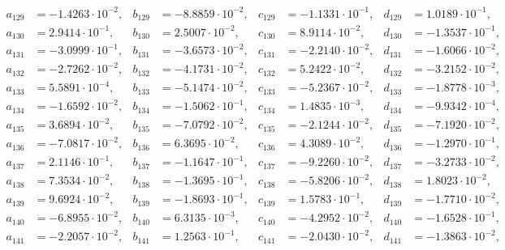 \begin{align*}
  a_{ 129 } &= -1.4263 \cdot 10^{ -2 }, & b_{ 129 } &= -8.8859 \cdot 10^{ -2 }, & c_{ 129 } &= -1.1331 \cdot 10^{ -1 }, & d_{ 129 } &= 1.0189 \cdot 10^{ -1 }, \\ 
  a_{ 130 } &= 2.9414 \cdot 10^{ -1 }, & b_{ 130 } &= 2.5007 \cdot 10^{ -2 }, & c_{ 130 } &= 8.9114 \cdot 10^{ -2 }, & d_{ 130 } &= -1.3537 \cdot 10^{ -1 }, \\ 
  a_{ 131 } &= -3.0999 \cdot 10^{ -1 }, & b_{ 131 } &= -3.6573 \cdot 10^{ -2 }, & c_{ 131 } &= -2.2140 \cdot 10^{ -2 }, & d_{ 131 } &= -1.6066 \cdot 10^{ -2 }, \\ 
  a_{ 132 } &= -2.7262 \cdot 10^{ -2 }, & b_{ 132 } &= -4.1731 \cdot 10^{ -2 }, & c_{ 132 } &= 5.2422 \cdot 10^{ -2 }, & d_{ 132 } &= -3.2152 \cdot 10^{ -2 }, \\ 
  a_{ 133 } &= 5.5891 \cdot 10^{ -4 }, & b_{ 133 } &= -5.1474 \cdot 10^{ -2 }, & c_{ 133 } &= -5.2367 \cdot 10^{ -2 }, & d_{ 133 } &= -1.8778 \cdot 10^{ -3 }, \\ 
  a_{ 134 } &= -1.6592 \cdot 10^{ -2 }, & b_{ 134 } &= -1.5062 \cdot 10^{ -1 }, & c_{ 134 } &= 1.4835 \cdot 10^{ -3 }, & d_{ 134 } &= -9.9342 \cdot 10^{ -4 }, \\ 
  a_{ 135 } &= 3.6894 \cdot 10^{ -2 }, & b_{ 135 } &= -7.0792 \cdot 10^{ -2 }, & c_{ 135 } &= -2.1244 \cdot 10^{ -2 }, & d_{ 135 } &= -7.1920 \cdot 10^{ -2 }, \\ 
  a_{ 136 } &= -7.0817 \cdot 10^{ -2 }, & b_{ 136 } &= 6.3695 \cdot 10^{ -2 }, & c_{ 136 } &= 4.3089 \cdot 10^{ -2 }, & d_{ 136 } &= -1.2970 \cdot 10^{ -1 }, \\ 
  a_{ 137 } &= 2.1146 \cdot 10^{ -1 }, & b_{ 137 } &= -1.1647 \cdot 10^{ -1 }, & c_{ 137 } &= -9.2260 \cdot 10^{ -2 }, & d_{ 137 } &= -3.2733 \cdot 10^{ -2 }, \\ 
  a_{ 138 } &= 7.3534 \cdot 10^{ -2 }, & b_{ 138 } &= -1.3695 \cdot 10^{ -1 }, & c_{ 138 } &= -5.8206 \cdot 10^{ -2 }, & d_{ 138 } &= 1.8023 \cdot 10^{ -2 }, \\ 
  a_{ 139 } &= 9.6924 \cdot 10^{ -2 }, & b_{ 139 } &= -1.8693 \cdot 10^{ -1 }, & c_{ 139 } &= 1.5783 \cdot 10^{ -1 }, & d_{ 139 } &= -1.7710 \cdot 10^{ -2 }, \\ 
  a_{ 140 } &= -6.8955 \cdot 10^{ -2 }, & b_{ 140 } &= 6.3135 \cdot 10^{ -3 }, & c_{ 140 } &= -4.2952 \cdot 10^{ -2 }, & d_{ 140 } &= -1.6528 \cdot 10^{ -1 }, \\ 
  a_{ 141 } &= -2.2057 \cdot 10^{ -2 }, & b_{ 141 } &= 1.2563 \cdot 10^{ -1 }, & c_{ 141 } &= -2.0430 \cdot 10^{ -2 }, & d_{ 141 } &= -1.3863 \cdot 10^{ -2 }, \\ 

\end{align*}
